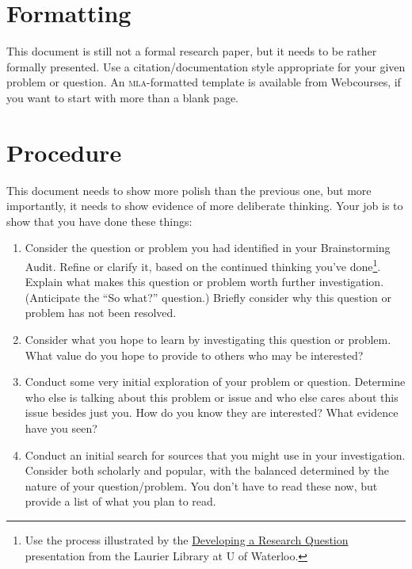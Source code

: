 \documentclass[12pt, oneside]{amsart}	%
\begin{document}
\section{Formatting} %
\label{sec:formatting}
This document is still not a formal research paper, but it needs to be rather formally presented. Use a citation/documentation style appropriate for your given problem or question. An \textsc{mla}-formatted template is available from Webcourses, if you want to start with more than a blank page.

\section{Procedure} %
\label{sec:procedure}
This document needs to show more polish than the previous one, but more importantly, it needs to show evidence of more deliberate thinking. Your job is to show that you have done these things:
\begin{enumerate}
	\item Consider the question or problem you had identified in your Brainstorming Audit. Refine or clarify it, based on the continued thinking you've done\footnote{Use the process illustrated by the \href{http://library.wlu.ca/tutorials/research_question}{Developing a Research Question} presentation from the Laurier Library at U of Waterloo.}. Explain what makes this question or problem worth further investigation. (Anticipate the ``So what?'' question.) Briefly consider why this question or problem has not been resolved.
	\item Consider what you hope to learn by investigating this question or problem. What value do you hope to provide to others who may be interested? 
	\item Conduct some very initial exploration of your problem or question. Determine who else is talking about this problem or issue and who else cares about this issue besides just you. How do you know they are interested? What evidence have you seen?
	\item Conduct an initial search for sources that you might use in your investigation. Consider both scholarly and popular, with the balanced determined by the nature of your question/problem. You don’t have to read these now, but provide a list of what you plan to read.
\end{enumerate}
\end{document}

